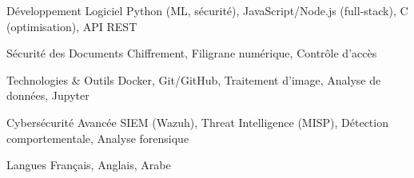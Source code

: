 
\begin{cvskills}

    \cvskill
    {Développement Logiciel} %
    {Python (ML, sécurité), JavaScript/Node.js (full-stack), C (optimisation), API REST} %


    \cvskill
    {Sécurité des Documents} %
    {Chiffrement, Filigrane numérique, Contrôle d'accès} %

    \cvskill
    {Technologies \& Outils} %
    {Docker, Git/GitHub, Traitement d'image, Analyse de données, Jupyter} %

    \cvskill
    {Cybersécurité Avancée} %
    {SIEM (Wazuh), Threat Intelligence (MISP), Détection comportementale, Analyse forensique} %

    \cvskill
    {Langues} %
    {Français, Anglais, Arabe } %

\end{cvskills}